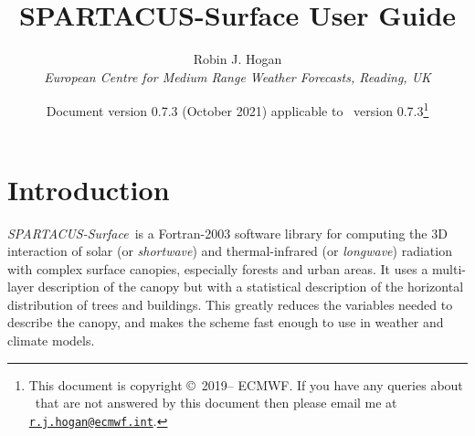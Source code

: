 \documentclass[a4,oneside]{article}
\title{SPARTACUS-Surface User Guide}
\author{Robin J. Hogan\\ \emph{European Centre for Medium Range
    Weather Forecasts, Reading, UK}}
\date{Document version 0.7.3 (October 2021) applicable to
  \spsurf\ version 0.7.3\thanks{This document is copyright
    \copyright\ 2019-- ECMWF. If you have any queries about
    \spsurf\ that are not answered by this document
%
%
    then please email me at
    \href{mailto:r.j.hogan@ecmwf.int}{\texttt{r.j.hogan@ecmwf.int}}.}}
\def\spsurf{\emph{SPARTACUS-Surface}}
\renewcommand\thefootnote{\relax}
\def\chapter{\section}
\begin{document}
\maketitle

\def\thefootnote{\fnsymbol{footnote}}

\chapter{Introduction}
\spsurf\ is a Fortran-2003 software library for computing the 3D
interaction of solar (or \emph{shortwave}) and thermal-infrared (or
\emph{longwave}) radiation with complex surface canopies, especially
forests and urban areas. It uses a multi-layer description of the
canopy but with a statistical description of the horizontal
distribution of trees and buildings. This greatly reduces the
variables needed to describe the canopy, and makes the scheme fast
enough to use in weather and climate models.
\end{document}

